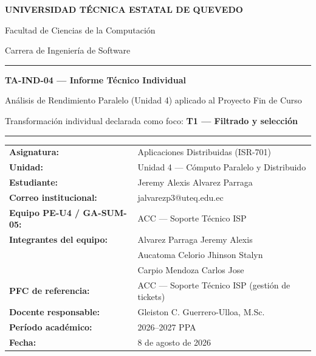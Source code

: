\documentclass[11pt,a4paper]{article}
\title{}
\date{}
\begin{document}
\begin{titlepage}
\centering
{\large\bfseries UNIVERSIDAD T\'ECNICA ESTATAL DE QUEVEDO\par}
\vspace{0.2cm}
{\normalsize Facultad de Ciencias de la Computaci\'on\par}
{\normalsize Carrera de Ingenier\'ia de Software\par}
\vspace{1.2cm}
\rule{0.8\textwidth}{0.4pt}\par
\vspace{0.6cm}
{\Large\bfseries TA-IND-04 --- Informe T\'ecnico Individual\par}
\vspace{0.3cm}
{\large An\'alisis de Rendimiento Paralelo (Unidad 4) aplicado al Proyecto Fin de Curso\par}
\vspace{0.3cm}
{\normalsize Transformaci\'on individual declarada como foco: \textbf{T1 --- Filtrado y selecci\'on}\par}
\vspace{0.6cm}
\rule{0.8\textwidth}{0.4pt}\par
\vspace{1.0cm}

\begin{tabular}{ll}
\textbf{Asignatura:} & Aplicaciones Distribuidas (ISR-701) \\
\textbf{Unidad:} & Unidad 4 --- C\'omputo Paralelo y Distribuido \\
\textbf{Estudiante:} & Jeremy Alexis Alvarez Parraga \\
\textbf{Correo institucional:} & jalvarezp3@uteq.edu.ec \\
\textbf{Equipo PE-U4 / GA-SUM-05:} & ACC --- Soporte T\'ecnico ISP \\
\textbf{Integrantes del equipo:} & Alvarez Parraga Jeremy Alexis \\
 & Aucatoma Celorio Jhinson Stalyn \\
 & Carpio Mendoza Carlos Jose \\
\textbf{PFC de referencia:} & ACC --- Soporte T\'ecnico ISP (gesti\'on de tickets) \\
\textbf{Docente responsable:} & Gleiston C. Guerrero-Ulloa, M.Sc. \\
\textbf{Per\'iodo acad\'emico:} & 2026--2027 PPA \\
\textbf{Fecha:} & 8 de agosto de 2026 \\
\end{tabular}


\end{titlepage}
\end{document}
